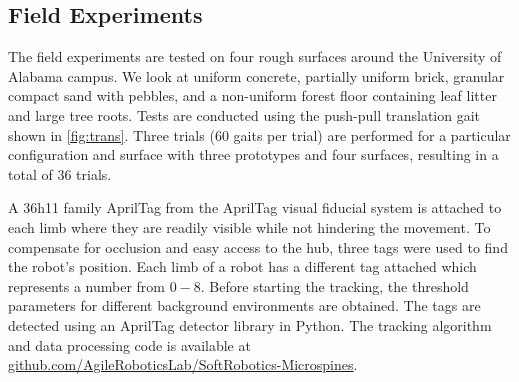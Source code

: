 \subsection{Field Experiments}
The field experiments are tested on four rough surfaces around the University of Alabama campus. We look at uniform concrete, partially uniform brick, granular compact sand with pebbles, and a non-uniform forest floor containing leaf litter and large tree roots. %
Tests are conducted using the push-pull translation gait shown in \Fig \ref{fig:trans}. Three trials (60 gaits per trial) are performed for a particular configuration and surface with three prototypes and four surfaces, resulting in a total of 36 trials. 


A 36h11 family AprilTag from the AprilTag visual fiducial system \cite{Olson_2011} is attached to each limb where they are readily visible while not hindering the movement. To compensate for occlusion and easy access to the hub, three tags were used to find the robot's position. Each limb of a robot has a different tag attached which represents a number from $0-8$. Before starting the tracking, the threshold parameters for different background environments are obtained. The tags are detected using an AprilTag detector library in Python. The tracking algorithm and data processing code is available at
\href{https://github.com/AgileRoboticsLab/SoftRobotics-Microspines}{github.com/AgileRoboticsLab/SoftRobotics-Microspines}.

    
